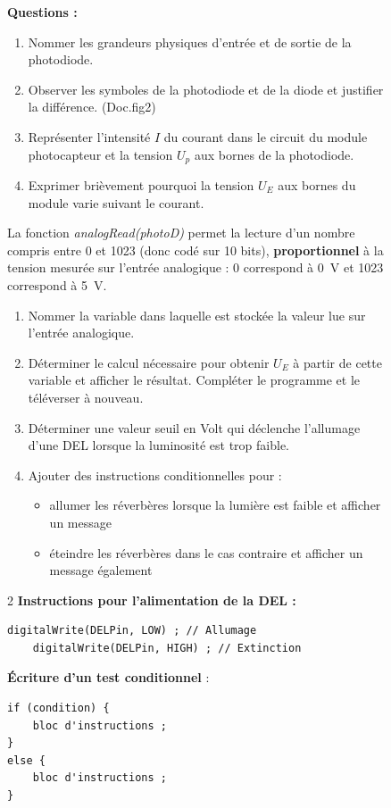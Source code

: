 \documentclass[a4paper,11pt]{article}
\begin{document}
\begin{figure}[h!]
	\textbf{Questions :}
	\begin{enumerate}
	\item Nommer les grandeurs physiques d'entrée et de sortie de la photodiode.
	\item Observer les symboles de la photodiode et de la diode et justifier la différence. (Doc.fig2)
	\item Représenter l'intensité $I$ du courant dans le circuit du module photocapteur et la tension $U_p$ aux bornes de la photodiode.
	\item Exprimer brièvement pourquoi la tension $U_E$ aux bornes du module varie suivant le courant.
\end{enumerate}
La fonction \emph{analogRead(photoD)} permet la lecture d'un nombre compris entre 0 et 1023 (donc codé sur 10 bits),  \textbf{proportionnel} à la tension mesurée sur l'entrée analogique : 0 correspond à \SI{0}{V} et 1023 correspond à \SI{5}{V}.

\begin{enumerate}[resume]
	\item Nommer la variable dans laquelle est stockée la valeur lue sur l'entrée analogique.
	\item Déterminer le calcul nécessaire pour obtenir $U_E$ à partir de cette variable et afficher le résultat. Compléter le programme et le téléverser à nouveau.
	\item Déterminer une valeur seuil en Volt qui déclenche l'allumage d'une DEL lorsque la luminosité est trop faible.
	\item Ajouter des instructions conditionnelles pour :
	\begin{itemize}
		\item allumer les réverbères lorsque la lumière est faible et afficher un message
		\item éteindre les réverbères dans le cas contraire et afficher un message également
	\end{itemize}
\end{enumerate}

\begin{multicols}{2}
\textbf{Instructions pour l'alimentation de la DEL :}
\begin{lstlisting}[style=Arduino]
	digitalWrite(DELPin, LOW) ; // Allumage
	digitalWrite(DELPin, HIGH) ; // Extinction
\end{lstlisting}

\columnbreak
\textbf{Écriture d'un test conditionnel} :
\begin{lstlisting}[style=Arduino]
if (condition) {
	bloc d'instructions ;
}
else {
	bloc d'instructions ;
}
\end{lstlisting}
\end{multicols}
\end{figure}
\end{document}
